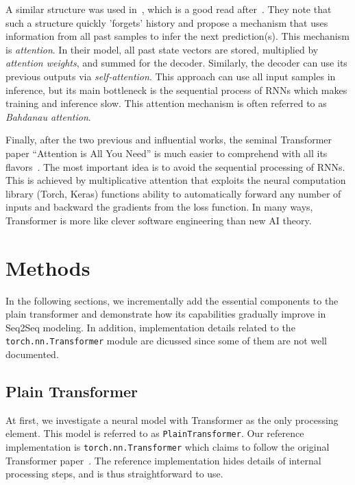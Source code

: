 \documentclass[final]{article}
\begin{document}
A similar structure was used in~\cite{Cho-2014-emnlp}, which is a good
read after~\cite{Sutskever-2014-neurips}. They note that such a
structure quickly 'forgets' history and propose a mechanism that uses
information from all past samples to infer the next prediction(s).
This mechanism is \textit{attention}. In their model,  all past state
vectors are stored, multiplied by \textit{attention weights}, and
summed for the decoder. Similarly, the decoder can use its previous
outputs via \textit{self-attention}. This approach can use all input samples in
inference, but its main bottleneck is the sequential process of RNNs
which makes training and inference slow. This attention mechanism is
often referred to as \textit{Bahdanau attention}.

Finally, after the two previous and influential works, the seminal
Transformer paper ``Attention is All You Need'' is much easier to
comprehend with all its flavors~\cite{transformer}. The most important
idea is to avoid the sequential processing of RNNs. This is achieved
by multiplicative attention that exploits the neural computation
library (Torch, Keras) functions ability to automatically forward any
number of inputs and backward the gradients from the loss function. In
many ways, Transformer is more like clever software engineering than
new AI theory.


\section{Methods}

In the following sections, we incrementally add the essential
components to the plain transformer and demonstrate how its
capabilities gradually improve in Seq2Seq modeling. In addition, implementation details related to the \texttt{torch.nn.Transformer} module are dicussed since some of them are not well documented.

\subsection{Plain Transformer}
\label{sec:PlainTransformer}

At first, we investigate a neural model with Transformer as the only processing element.
This model is referred to as \texttt{PlainTransformer}. Our reference implementation is \texttt{torch.nn.Transformer} which claims to follow the original Transformer paper~\cite{transformer}. The reference implementation hides details of internal processing steps, and is thus straightforward to use.
\end{document}
